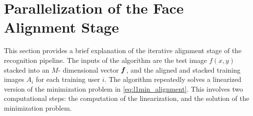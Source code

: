 \documentclass[10pt,twocolumn,letterpaper]{article}
\begin{document}
\section{Parallelization of the Face Alignment Stage}
\label{sec:alignment}
This section provides a brief explanation of the iterative alignment stage
of the recognition pipeline.  
The inputs of the algorithm are the test image $f(x,y)$ stacked into an $M$-
dimensional vector $\boldsymbol{f}$, and the aligned and stacked training images $A_i$ for
each training user $i$. 
The algorithm repeatedly solves a linearized version of the minimization problem
in \eqref{eq:l1min_alignment}.  This involves two computational steps:
the computation of the linearization, and the solution of the minimization problem.
\end{document}
